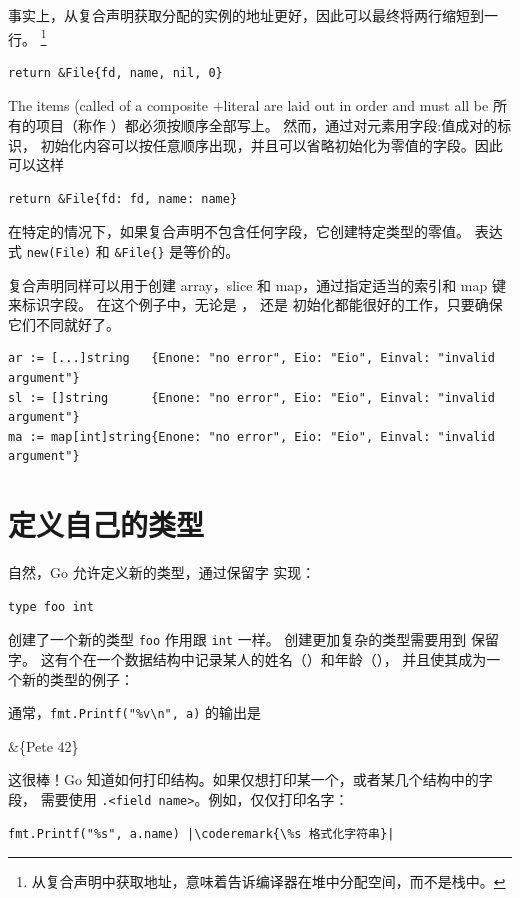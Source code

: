 事实上，从复合声明获取分配的实例的地址更好，因此可以最终将两行缩短到一行。
\footnote{从复合声明中获取地址，意味着告诉编译器在堆中分配空间，而不是栈中。}
\begin{lstlisting}
return &File{fd, name, nil, 0}
\end{lstlisting}
The items (called  of a composite 
+literal are laid out in order and must all be
所有的项目（称作 ）都必须按顺序全部写上。
然而，通过对元素用字段:值成对的标识，
初始化内容可以按任意顺序出现，并且可以省略初始化为零值的字段。因此可以这样

\begin{lstlisting}
return &File{fd: fd, name: name}
\end{lstlisting}
在特定的情况下，如果复合声明不包含任何字段，它创建特定类型的零值。
表达式 \lstinline{new(File)} 和 \lstinline|&File{}| 是等价的。

复合声明同样可以用于创建 array，slice 和 map，通过指定适当的索引和 map 键来标识字段。
在这个例子中，无论是 ， 还是  初始化都能很好的工作，只要确保它们不同就好了。
\begin{lstlisting}
ar := [...]string   {Enone: "no error", Eio: "Eio", Einval: "invalid argument"}
sl := []string      {Enone: "no error", Eio: "Eio", Einval: "invalid argument"}
ma := map[int]string{Enone: "no error", Eio: "Eio", Einval: "invalid argument"}
\end{lstlisting}

\section{定义自己的类型}
\label{sec:defining your own}
自然，Go 允许定义新的类型，通过保留字
 实现： 
\begin{lstlisting}
type foo int
\end{lstlisting}
创建了一个新的类型 \lstinline{foo} 作用跟 \lstinline{int} 一样。
创建更加复杂的类型需要用到  保留字。
这有个在一个数据结构中记录某人的姓名（）和年龄（），
并且使其成为一个新的类型的例子：

通常，\lstinline{fmt.Printf("%v\n", a)} 的输出是
\begin{display}
&\{Pete 42\}
\end{display}
这很棒！Go 知道如何打印结构。如果仅想打印某一个，或者某几个结构中的字段，
需要使用 \verb|.<field name>|。例如，仅仅打印名字：
\begin{lstlisting}
fmt.Printf("%s", a.name) |\coderemark{\%s 格式化字符串}|
\end{lstlisting}


